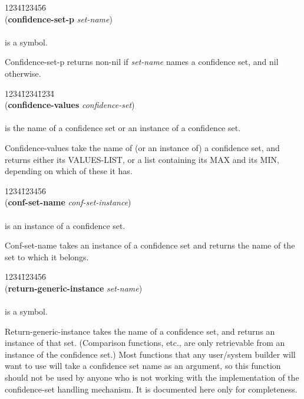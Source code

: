 \begin{tabbing}
1234\=123456\= \kill
\\
({\bf confidence-set-p} {\it set-name}) \\
\\
 is a symbol. \\
\end{tabbing}
Confidence-set-p returns non-nil if {\it set-name} names a confidence
set, and nil otherwise.


\begin{tabbing}
1234\=1234\=1234\= \kill
\\
({\bf confidence-values} {\it confidence-set}) \\
\\
 is the name of a confidence set or an instance
of a confidence set. \\
\end{tabbing}
Confidence-values take the name of (or an instance of) a confidence
set, and returns either its VALUES-LIST, or a list containing its MAX
and its MIN, depending on which of these it has.

\begin{tabbing}
1234\=123456\= \kill
\\
({\bf conf-set-name} {\it conf-set-instance}) \\
\\
 is an instance of a confidence set.\\
\end{tabbing}
Conf-set-name takes an instance of a confidence set and returns the
name of the set to which it belongs.

\begin{tabbing}
1234\=123456\= \kill
\\
({\bf return-generic-instance} {\it set-name}) \\
\\
\> is a symbol. \\
\end{tabbing}
Return-generic-instance takes the name of a confidence set, and
returns an instance of that set. (Comparison functions, etc., are only
retrievable from an instance of the confidence set.) Most functions
that any user/system builder will want to use will take a confidence
set name as an argument, so this function should not be used by anyone
who is not working with the implementation of the confidence-set
handling mechanism. It is documented here only for completeness.


